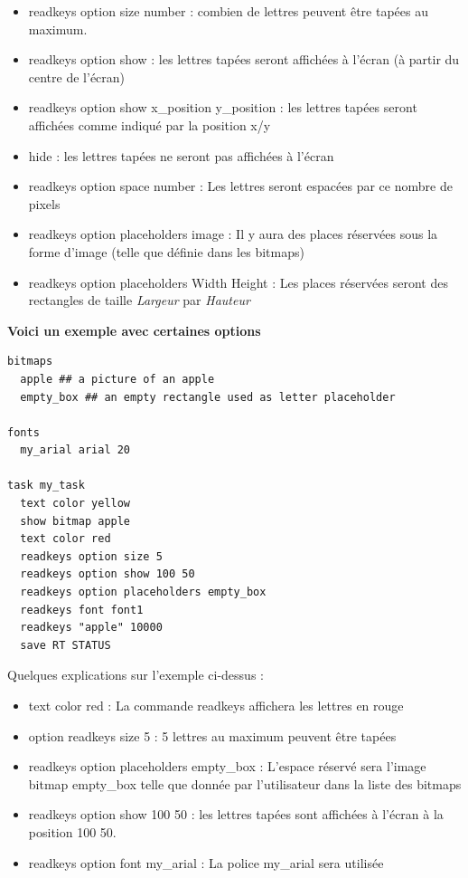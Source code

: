 \documentclass[
]{book}
\providecommand{\tightlist}{%
  \setlength{\itemsep}{0pt}\setlength{\parskip}{0pt}}
\begin{document}
\begin{itemize}
\tightlist
\item
  readkeys option size number : combien de lettres peuvent être tapées au maximum.
\item
  readkeys option show : les lettres tapées seront affichées à l'écran (à partir du centre de l'écran)
\item
  readkeys option show x\_position y\_position : les lettres tapées seront affichées comme indiqué par la position x/y
\item
  hide : les lettres tapées ne seront pas affichées à l'écran
\item
  readkeys option space number : Les lettres seront espacées par ce nombre de pixels
\item
  readkeys option placeholders image : Il y aura des places réservées sous la forme d'image (telle que définie dans les bitmaps)
\item
  readkeys option placeholders Width Height : Les places réservées seront des rectangles de taille \emph{Largeur} par \emph{Hauteur}
\end{itemize}

\textbf{Voici un exemple avec certaines options}

\begin{verbatim}
bitmaps
  apple ## a picture of an apple
  empty_box ## an empty rectangle used as letter placeholder

fonts
  my_arial arial 20

task my_task
  text color yellow
  show bitmap apple
  text color red
  readkeys option size 5
  readkeys option show 100 50
  readkeys option placeholders empty_box
  readkeys font font1
  readkeys "apple" 10000
  save RT STATUS
\end{verbatim}

Quelques explications sur l'exemple ci-dessus :

\begin{itemize}
\tightlist
\item
  text color red : La commande readkeys affichera les lettres en rouge
\item
  option readkeys size 5 : 5 lettres au maximum peuvent être tapées
\item
  readkeys option placeholders empty\_box : L'espace réservé sera l'image bitmap empty\_box telle que donnée par l'utilisateur dans la liste des bitmaps
\item
  readkeys option show 100 50 : les lettres tapées sont affichées à l'écran à la position 100 50.
\item
  readkeys option font my\_arial : La police my\_arial sera utilisée
\end{itemize}
\end{document}
